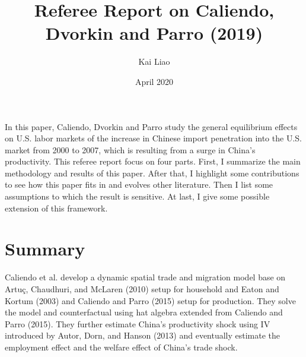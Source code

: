 \documentclass{article}
\title{Referee Report on Caliendo, Dvorkin and Parro (2019)}
\author{Kai Liao}
\date{April 2020}
\begin{document}
\maketitle
In this paper, Caliendo, Dvorkin and Parro study the general equilibrium effects on U.S. labor markets of the increase in Chinese import penetration into the U.S. market from 2000 to 2007, which is resulting from a surge in China's productivity. This referee report focus on four parts. First, I summarize the main methodology and results of this paper. After that, I highlight some contributions to see how this paper fits in and evolves other literature. Then I list some assumptions to which the result is sensitive. At last, I give some possible extension of this framework. 
\section{Summary}
    Caliendo et al. develop a dynamic spatial trade and migration model base on Artuç, Chaudhuri, and McLaren (2010) setup for household and Eaton and Kortum (2003) and Caliendo and Parro (2015) setup for production. They solve the model and counterfactual using hat algebra extended from Caliendo and Parro (2015). They further estimate China's productivity shock using IV introduced by Autor, Dorn, and Hanson (2013) and eventually estimate the employment effect and the welfare effect of China's trade shock.
\end{document}
